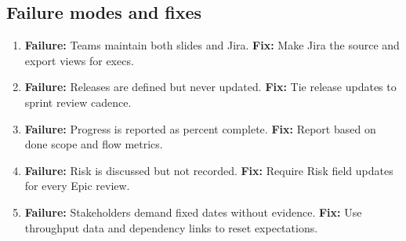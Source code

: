 \subsection{Failure modes and fixes}
\begin{enumerate}
  \item \textbf{Failure:} Teams maintain both slides and Jira. \textbf{Fix:} Make Jira the source and export views for execs.
  \item \textbf{Failure:} Releases are defined but never updated. \textbf{Fix:} Tie release updates to sprint review cadence.
  \item \textbf{Failure:} Progress is reported as percent complete. \textbf{Fix:} Report based on done scope and flow metrics.
  \item \textbf{Failure:} Risk is discussed but not recorded. \textbf{Fix:} Require Risk field updates for every Epic review.
  \item \textbf{Failure:} Stakeholders demand fixed dates without evidence. \textbf{Fix:} Use throughput data and dependency links to reset expectations.
\end{enumerate}










